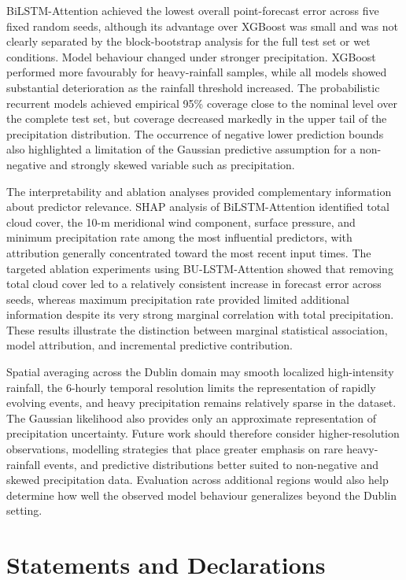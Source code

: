 \documentclass[referee,pdflatex,sn-basic]{sn-jnl}%
\theoremstyle{thmstyleone}%
\theoremstyle{thmstyletwo}%
\theoremstyle{thmstylethree}%
\begin{document}
BiLSTM-Attention achieved the lowest overall point-forecast error across five fixed random seeds, although its advantage over XGBoost was small and was not clearly separated by the block-bootstrap analysis for the full test set or wet conditions. Model behaviour changed under stronger precipitation. XGBoost performed more favourably for heavy-rainfall samples, while all models showed substantial deterioration as the rainfall threshold increased. The probabilistic recurrent models achieved empirical 95\% coverage close to the nominal level over the complete test set, but coverage decreased markedly in the upper tail of the precipitation distribution. The occurrence of negative lower prediction bounds also highlighted a limitation of the Gaussian predictive assumption for a non-negative and strongly skewed variable such as precipitation.

The interpretability and ablation analyses provided complementary information about predictor relevance. SHAP analysis of BiLSTM-Attention identified total cloud cover, the 10-m meridional wind component, surface pressure, and minimum precipitation rate among the most influential predictors, with attribution generally concentrated toward the most recent input times. The targeted ablation experiments using BU-LSTM-Attention showed that removing total cloud cover led to a relatively consistent increase in forecast error across seeds, whereas maximum precipitation rate provided limited additional information despite its very strong marginal correlation with total precipitation. These results illustrate the distinction between marginal statistical association, model attribution, and incremental predictive contribution.

Spatial averaging across the Dublin domain may smooth localized high-intensity rainfall, the 6-hourly temporal resolution limits the representation of rapidly evolving events, and heavy precipitation remains relatively sparse in the dataset. The Gaussian likelihood also provides only an approximate representation of precipitation uncertainty. Future work should therefore consider higher-resolution observations, modelling strategies that place greater emphasis on rare heavy-rainfall events, and predictive distributions better suited to non-negative and skewed precipitation data. Evaluation across additional regions would also help determine how well the observed model behaviour generalizes beyond the Dublin setting.



\section*{Statements and Declarations}
\end{document}
